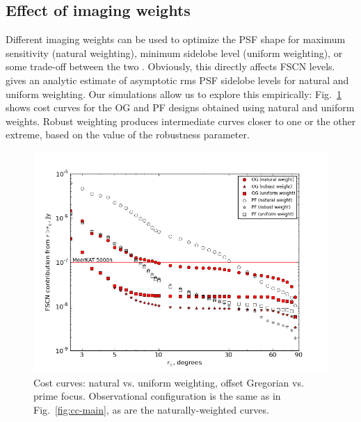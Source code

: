 \documentclass{aa}
\begin{document}
\subsection{Effect of imaging weights}
\label{sec:img-weights}

Different imaging weights can be used to optimize the PSF shape for maximum sensitivity (natural weighting), minimum sidelobe level (uniform weighting), or some trade-off between the two \citep[robust or Briggs weighting:][]{briggs-thesis}. Obviously, this directly affects FSCN levels. \citet{SKA49} gives an analytic estimate of asymptotic rms PSF sidelobe levels for natural and uniform weighting. Our simulations allow us to explore this empirically: Fig.~\ref{fig:cc-weights} shows cost curves for the OG and PF designs obtained using natural and uniform weights. Robust weighting produces intermediate curves closer to one or the other extreme, based on the value of the robustness parameter.

\begin{figure}
  \includegraphics[width=\columnwidth]{cc-mk-nat-vs-uni}
\caption{\label{fig:cc-weights}Cost curves: natural vs. uniform weighting, offset Gregorian vs. prime focus. Observational configuration is the same as in Fig.~\ref{fig:cc-main}, as are the naturally-weighted curves.}
\end{figure}
\end{document}
